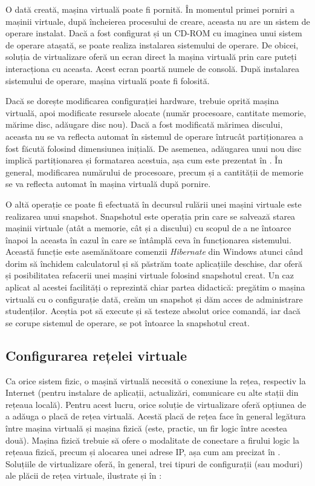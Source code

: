 O dată creată, mașina virtuală poate fi pornită.
În momentul primei porniri a mașinii virtuale, după încheierea
procesului de creare, aceasta nu are un sistem de operare instalat.
Dacă a fost configurat și un CD-ROM cu imaginea unui sistem de operare
atașată, se poate
realiza instalarea sistemului de operare. De obicei, soluția de virtualizare
oferă un ecran direct la mașina virtuală prin care puteți interacționa cu
aceasta. Acest ecran poartă numele de consolă. După instalarea
sistemului de operare, mașina virtuală poate fi folosită.

Dacă se dorește modificarea configurației hardware, trebuie
oprită mașina
virtuală, apoi modificate resursele alocate (număr procesoare, cantitate memorie,
mărime disc, adăugare disc nou). Dacă a fost modificată mărimea discului,
aceasta nu se va reflecta automat în sistemul de operare întrucât partiționarea
a fost făcută folosind dimensiunea inițială. De asemenea, adăugarea unui nou disc
implică partiționarea și formatarea acestuia, așa cum este prezentat în . În general, modificarea numărului
de procesoare, precum și a cantității de memorie se va reflecta automat în mașina
virtuală după pornire.

O altă operație ce poate fi efectuată în decursul rulării unei mașini virtuale
este realizarea unui snapshot. Snapshotul este operația prin care se salvează starea mașinii
virtuale (atât a memorie, cât și a discului) cu scopul de a ne întoarce înapoi la
aceasta în cazul în care se întâmplă ceva în funcționarea sistemului. Această
funcție este asemănătoare comenzii \textit{Hibernate} din Windows atunci când dorim să închidem
calculatorul și să păstrăm toate aplicațiile deschise, dar oferă și posibilitatea
refacerii unei mașini virtuale folosind snapshotul creat. Un caz aplicat al
acestei facilități o reprezintă chiar partea didactică: pregătim o mașina
virtuală cu o configurație dată, creăm un snapshot și dăm acces de administrare
studenților. Aceștia pot să execute și să testeze absolut orice comandă, iar dacă
se corupe sistemul de operare, se pot întoarce la snapshotul creat.

\subsection{Configurarea rețelei virtuale}
\label{sec:vm:ops:net}

Ca orice sistem fizic, o mașină virtuală necesită o conexiune la rețea,
respectiv la Internet (pentru instalare de aplicații, actualizări, comunicare cu
alte stații din rețeaua locală). Pentru acest lucru, orice soluție de
virtualizare oferă opțiunea de a adăuga o placă de rețea virtuală. Acestă placă
de rețea face în general legătura între mașina virtuală și mașina fizică (este,
practic, un fir logic între acestea două). Mașina fizică trebuie să ofere o
modalitate de conectare a firului logic la rețeaua fizică, precum și alocarea
unei adrese IP, așa cum am precizat în . Soluțiile de
virtualizare oferă, în general, trei tipuri de configurații (sau moduri) ale
plăcii de rețea virtuale, ilustrate și în :

